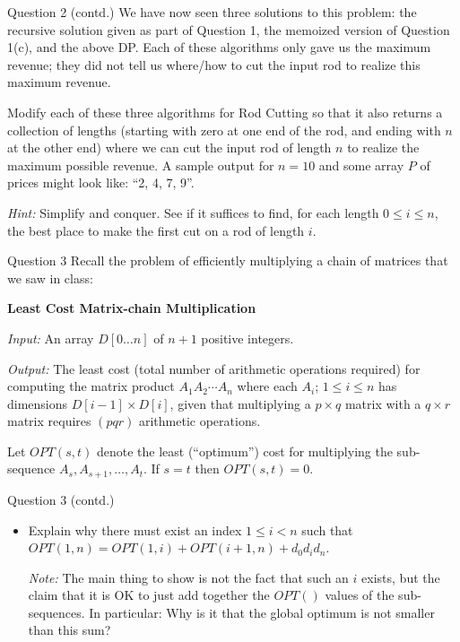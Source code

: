 \documentclass{beamer}
\begin{document}
\begin{frame}{Question 2 (contd.)}
We have now seen three solutions to this problem: the recursive solution given as part of
Question 1, the memoized version of Question 1(c), and the above DP. Each of these algorithms only gave us the maximum revenue; they did not tell us where/how to cut the input
rod to realize this maximum revenue.

\medskip
Modify each of these three algorithms for Rod Cutting so that it also returns a collection of
lengths (starting with zero at one end of the rod, and ending with $n$ at the other end) where
we can cut the input rod of length $n$ to realize the maximum possible revenue. A sample
output for $n = 10$ and some array $P$ of prices might look like: ``2, 4, 7, 9''.

\medskip
\textit{Hint:} Simplify and conquer. See if it suffices to find, for each length $0 \leq i \leq n$, the best place to make the first cut on a rod of length $i$.
\end{frame}

\begin{frame}{Question 3}
Recall the problem of efficiently multiplying a chain of matrices that we saw in class:

\medskip
\textbf{Least Cost Matrix-chain Multiplication}

\textit{Input:} An array $D[0\ldots n]$ of $n+1$ positive integers.

\textit{Output:} The least cost (total number of arithmetic operations required) for computing the matrix product $A_1 A_2 \cdots A_n$ where each $A_i$; $1 \leq i \leq n$ has dimensions $D[i-1] \times D[i]$, given that multiplying a $p \times q$ matrix with a $q \times r$ matrix requires $(pqr)$ arithmetic operations.

\medskip
Let $OPT(s, t)$ denote the least (``optimum'') cost for multiplying the sub-sequence $A_s, A_{s+1}, \ldots, A_t$.
If $s = t$ then $OPT(s, t) = 0$.
\end{frame}

\begin{frame}{Question 3 (contd.)}
\begin{itemize}
  \item[(a)] Explain why there must exist an index $1 \leq i < n$ such that $OPT(1,n) = OPT(1,i) + OPT(i+1,n) + d_0 d_i d_n$.

  \textit{Note:} The main thing to show is not the fact that such an $i$ exists, but the claim that it is OK to just add together the $OPT()$ values of the sub-sequences. In particular: Why is it that the global optimum is not smaller than this sum?
\end{itemize}
\end{frame}
\end{document}
